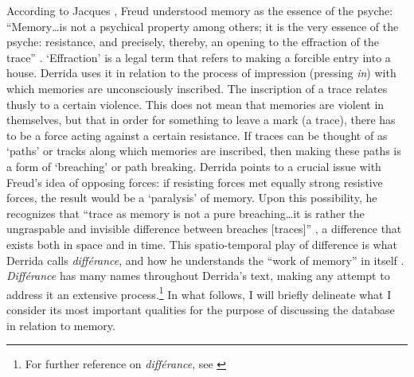 According to Jacques \textcite{Der78:Wri}, Freud understood memory as the essence of the psyche: ``Memory\dots is not a psychical property among others; it is the very essence of the psyche: resistance, and precisely, thereby, an opening to the effraction of the trace'' \parencite[201]{Der78:Wri}. `Effraction' is a legal term that refers to making a forcible entry into a house. Derrida uses it in relation to the process of impression (pressing \textit{in}) with which memories are unconsciously inscribed. The inscription of a trace relates thusly to a certain violence. This does not mean that memories are violent in themselves, but that in order for something to leave a mark (a trace), there has to be a force acting against a certain resistance. If traces can be thought of as `paths' or tracks along which memories are inscribed, then making these paths is a form of `breaching' or path breaking. Derrida points to a crucial issue with Freud's idea of opposing forces: if resisting forces met equally strong resistive forces, the result would be a `paralysis' of memory. Upon this possibility, he recognizes that ``trace as memory is not a pure breaching\dots it is rather the ungraspable and invisible difference between breaches [traces]'' \parencite[201]{Der78:Wri}, a difference that exists both in space and in time. This spatio-temporal play of difference is what Derrida calls \textit{différance}, and how he understands the ``work of memory'' in itself \parencite[226]{Der78:Wri}. \textit{Différance} has many names throughout Derrida's text, making any attempt to address it an extensive process.\footnote{For further reference on \textit{différance}, see \parencites[71-72]{Gra15:The}[219]{Der78:Wri}{Der82:Mar}} In what follows, I will briefly delineate what I consider its most important qualities for the purpose of discussing the database in relation to memory.

